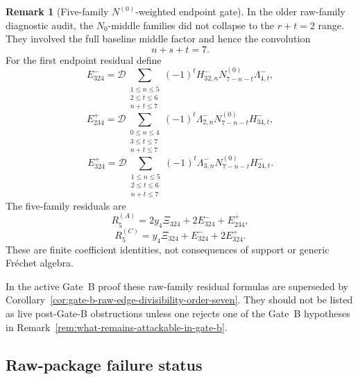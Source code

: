 \documentclass[11pt,a4paper]{amsart}
\theoremstyle{plain}
\theoremstyle{definition}
\newtheorem{remark}[theorem]{Remark}
\begin{document}
\begin{remark}[Five-family \(N^{(0)}\)-weighted endpoint gate]
\label{rem:five-family-n0-weighted-endpoint-gate}
In the older raw-family diagnostic audit, the \(N_0\)-middle families did
not collapse to the \(r+t=2\) range.  They involved the full baseline
middle factor and hence the convolution
\[
n+s+t=7.
\]
For the first endpoint residual define
\[
E^-_{324}
=
\mathcal D
\sum_{\substack{1\le n\le5\\2\le t\le6\\n+t\le7}}
(-1)^tH^-_{32,n}N^{(0)}_{7-n-t}\Lambda^-_{4,t},
\]
\[
E^+_{234}
=
\mathcal D
\sum_{\substack{0\le n\le4\\3\le t\le7\\n+t\le7}}
(-1)^t\Lambda^-_{2,n}N^{(0)}_{7-n-t}H^-_{34,t},
\]
\[
E^+_{324}
=
\mathcal D
\sum_{\substack{1\le n\le5\\2\le t\le6\\n+t\le7}}
(-1)^t\Lambda^-_{3,n}N^{(0)}_{7-n-t}H^-_{24,t}.
\]
The five-family residuals are
\[
R^{(A)}_5=2y_4\Xi_{324}+2E^-_{324}+E^+_{234},
\]
\[
R^{(C)}_5=y_4\Xi_{324}+E^-_{324}+2E^+_{324}.
\]
These are finite coefficient identities, not consequences of support or
generic Fr\'echet algebra.

In the active Gate~B proof these raw-family residual formulas are
superseded by Corollary~\ref{cor:gate-b-raw-edge-divisibility-order-seven}.
They should not be listed as live post-Gate-B obstructions unless one
rejects one of the Gate~B hypotheses in
Remark~\ref{rem:what-remains-attackable-in-gate-b}.
\end{remark}

\subsection{Raw-package failure status}
\label{subsec:raw-package-failure-status}
\end{document}
